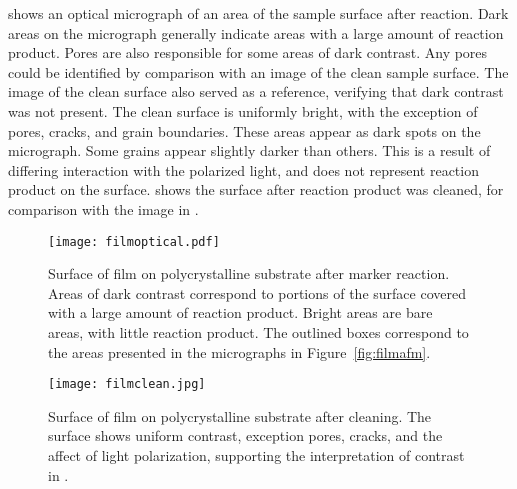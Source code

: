  shows an optical micrograph of an area of the sample surface after
reaction. Dark areas on the micrograph generally indicate areas with a large amount of
reaction product. Pores are also responsible for some areas of dark contrast. Any pores
could be identified by comparison with an image of the clean sample surface. The image of
the clean surface also served as a reference, verifying that dark contrast was not
present. The clean surface is uniformly bright, with the exception of pores, cracks, and
grain boundaries. These areas appear as dark spots on the micrograph. Some grains appear
slightly darker than others. This is a result of differing interaction with the polarized
light, and does not represent reaction product on the surface.  shows
the surface after reaction product was cleaned, for comparison with the image in
.
\begin{figure}
\begin{center}
	\texttt{[image: filmoptical.pdf]}
		\caption[Film surface after reaction]{%
			Surface of  film on polycrystalline
			 substrate after marker reaction. Areas
			of dark contrast correspond to portions of the surface
			covered with a large amount of reaction product.
			Bright areas are bare areas, with little reaction
			product. The outlined boxes correspond to the areas
			presented in the  micrographs in Figure~\ref{fig:filmafm}. }
	\label{fig:filmoptical}
	\end{center} 
\end{figure}
%
%
\begin{figure}
\begin{center}
\texttt{[image: filmclean.jpg]}
\caption[Cleaned film surface]{%
	Surface of  film on polycrystalline  
	substrate after cleaning. The surface shows uniform contrast, exception pores, cracks,
and the affect of light polarization,
	supporting the interpretation of contrast in .}
\label{fig:filmclean}
\end{center}
\end{figure}

